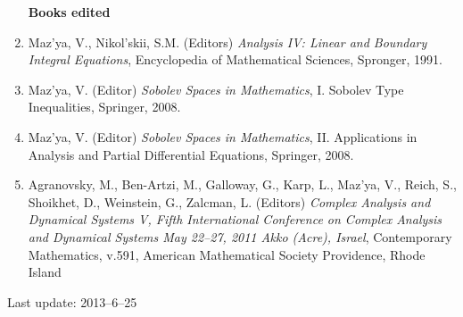 \documentclass{article}
\newcommand{\authors}[1]{\item #1\ignorespaces}
\renewcommand{\title}[1]{, \textit{#1}\ignorespaces}
\newcommand{\journal}[1]{, {#1}\ignorespaces}
\newcommand{\jitem}[1]{.}
\begin{document}
\begin{enumerate}
\bigskip

\textbf{\large Books edited}

\item Maz'ya, V., Nikol'skii, S.M. (Editors) {\it Analysis IV: Linear and Boundary Integral Equations}, Encyclopedia of Mathematical Sciences, Spronger, 1991.

\item Maz'ya, V. (Editor)
 {\it Sobolev Spaces in Mathematics},  I. Sobolev Type Inequalities, Springer,  2008.

\item Maz'ya, V. (Editor)
 {\it Sobolev Spaces in Mathematics},  II. Applications in Analysis and Partial Differential Equations, Springer,  2008.


\item  Agranovsky, M.,  Ben-Artzi, M.,  Galloway, G., 
 Karp, L.,  Maz'ya, V.,  Reich, S.,  Shoikhet, D., 
  Weinstein, G.,  Zalcman, L. 
(Editors) {\it Complex Analysis and
Dynamical Systems V, 
Fifth International Conference on
Complex Analysis and Dynamical Systems
May 22--27, 2011
Akko (Acre), Israel}, Contemporary Mathematics, v.591, American Mathematical Society
Providence, Rhode Island

\end{enumerate}

Last update: 2013--6--25
\end{document}
